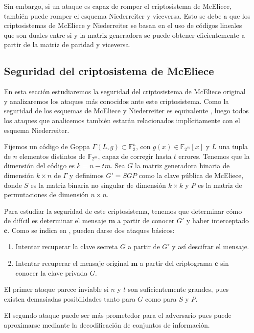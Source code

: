 Sin embargo, si un ataque es capaz de romper el criptosistema de McEliece, también puede romper el esquema Niederreiter y viceversa. Esto se debe a que los criptosistemas de McEliece y Niederreiter se basan en el uso de códigos lineales que son duales entre si y la matriz generadora se puede obtener eficientemente a partir de la matriz de paridad y viceversa.

\subsection{Seguridad del criptosistema de McEliece}

En esta sección estudiaremos la seguridad del criptosistema de McEliece original y analizaremos los ataques más conocidos ante este criptosistema. Como la seguridad de los esquemas de McEliece y Niederreiter es equivalente \cite{Equivalence_McEliece_Niederreiter}, luego todos los ataques que analicemos también estarán relacionados implícitamente con el esquema Niederreiter.

Fijemos un código de Goppa $\Gamma(L, g) \subset \mathbb{F}_2^n$, con $g(x) \in \mathbb{F}_{2^m}[x]$ y $L$ una tupla de $n$ elementos distintos de $\mathbb{F}_{2^m}$, capaz de corregir hasta $t$ errores. Tenemos que la dimensión del código es $k = n - tm$. Sea $G$ la matriz generadora binaria de dimensión $k \times n$ de $\Gamma$ y definimos $G' = SGP$ como la clave pública de McEliece, donde $S$ es la matriz binaria no singular de dimensión $k \times k$ y $P$ es la matriz de permutaciones de dimensión $n \times n$.

Para estudiar la seguridad de este criptosistema, tenemos que determinar cómo de difícil es determinar el mensaje $\textbf{m}$ a partir de conocer $G'$ y haber interceptado $\textbf{c}$. Como se indica en \cite{McEliece_1978}, pueden darse dos ataques básicos:

\begin{enumerate}
    \item Intentar recuperar la clave secreta $G$ a partir de $G'$ y así descifrar el mensaje.
    \item Intentar recuperar el mensaje original $\textbf{m}$ a partir del criptograma $\textbf{c}$ sin conocer la clave privada $G$.
\end{enumerate}

El primer ataque parece inviable si $n$ y $t$ son suficientemente grandes, pues existen demasiadas posibilidades tanto para $G$ como para $S$ y $P$.

El segundo ataque puede ser más prometedor para el adversario pues puede aproximarse mediante la decodificación de conjuntos de información.

